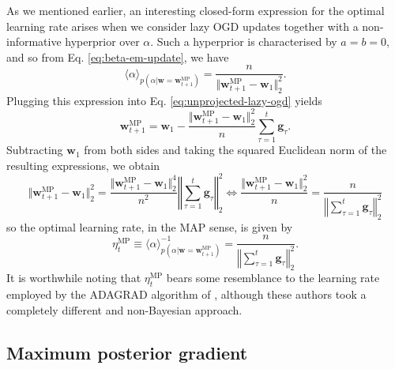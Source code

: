 As we mentioned earlier, an interesting closed-form expression for the optimal learning rate arises when we consider lazy OGD updates together with a non-informative hyperprior over $\alpha$. Such a hyperprior is characterised by $a = b = 0$, and so from Eq. \eqref{eq:beta-em-update}, we have
\begin{equation}
\label{eq:beta-em-update-uninformative}
	\langle\alpha\rangle_{p(\alpha|\mathbf{w} = \mathbf{w}_{t+1}^\text{MP})}
	= \frac{n}{\Vert\mathbf{w}_{t+1}^\text{MP}-\mathbf{w}_1\Vert_2^2}.
\end{equation}
Plugging this expression into Eq. \eqref{eq:unprojected-lazy-ogd} yields
\begin{equation}
	\mathbf{w}_{t+1}^\text{MP}
	= \mathbf{w}_1 - \frac{\Vert\mathbf{w}_{t+1}^\text{MP} - \mathbf{w}_1\Vert_2^2}{n}\sum_{\tau=1}^{t}\mathbf{g}_\tau.
\end{equation}
Subtracting $\mathbf{w}_1$ from both sides and taking the squared Euclidean norm of the resulting expressions, we obtain
\begin{equation}
\label{eq:mapgrad-update-rule-3}
	\Vert\mathbf{w}_{t+1}^\text{MP} - \mathbf{w}_1\Vert_2^2
	= \frac{\Vert\mathbf{w}_{t+1}^\text{MP}-\mathbf{w}_1\Vert_2^4}{n^2}\left\Vert\sum_{\tau=1}^t\mathbf{g}_\tau\right\Vert_2^2
	\iff
	\frac{\Vert\mathbf{w}_{t+1}^\text{MP} - \mathbf{w}_1\Vert_2^2}{n} = \frac{n}{\left\Vert\sum_{\tau=1}^t\mathbf{g}_\tau\right\Vert_2^2}
\end{equation}
so the optimal learning rate, in the MAP sense, is given by
\begin{equation}
\label{eq:mapgrad-learning-rate}
	\eta_t^{\text{MP}}
	\equiv \langle\alpha\rangle^{-1}_{p(\alpha|\mathbf{w}=\mathbf{w}_{t+1}^\text{MP})} 
	= \frac{n}{\left\Vert\sum_{\tau=1}^t\mathbf{g}_\tau\right\Vert_2^2}.
\end{equation}
It is worthwhile noting that $\eta_t^{\text{MP}}$ bears some resemblance to the learning rate employed by the ADAGRAD algorithm of \citet{adagrad}, although these authors took a completely different and non-Bayesian approach.

\subsection{Maximum posterior gradient}

